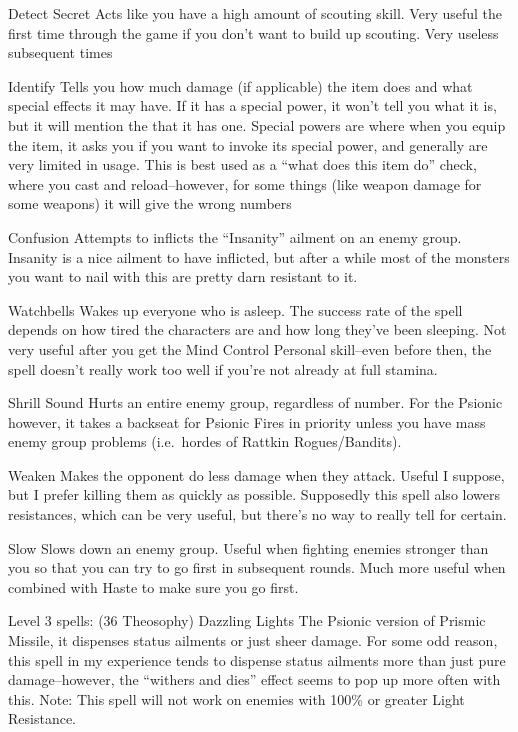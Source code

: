\documentclass[12pt]{article}
\begin{document}
Detect Secret Acts like you have a high amount of scouting skill. Very
useful the first time through the game if you don't want to build up
scouting. Very useless subsequent times

Identify Tells you how much damage (if applicable) the item does and
what special effects it may have. If it has a special power, it won't
tell you what it is, but it will mention the that it has one. Special
powers are where when you equip the item, it asks you if you want to
invoke its special power, and generally are very limited in usage. This
is best used as a ``what does this item do'' check, where you cast and
reload--however, for some things (like weapon damage for some weapons)
it will give the wrong numbers

Confusion Attempts to inflicts the ``Insanity'' ailment on an enemy
group. Insanity is a nice ailment to have inflicted, but after a while
most of the monsters you want to nail with this are pretty darn
resistant to it.

Watchbells Wakes up everyone who is asleep. The success rate of the
spell depends on how tired the characters are and how long they've been
sleeping. Not very useful after you get the Mind Control Personal
skill--even before then, the spell doesn't really work too well if
you're not already at full stamina.

Shrill Sound Hurts an entire enemy group, regardless of number. For the
Psionic however, it takes a backseat for Psionic Fires in priority
unless you have mass enemy group problems (i.e.~hordes of Rattkin
Rogues/Bandits).

Weaken Makes the opponent do less damage when they attack. Useful I
suppose, but I prefer killing them as quickly as possible. Supposedly
this spell also lowers resistances, which can be very useful, but
there's no way to really tell for certain.

Slow Slows down an enemy group. Useful when fighting enemies stronger
than you so that you can try to go first in subsequent rounds. Much more
useful when combined with Haste to make sure you go first.

Level 3 spells: (36 Theosophy) Dazzling Lights The Psionic version of
Prismic Missile, it dispenses status ailments or just sheer damage. For
some odd reason, this spell in my experience tends to dispense status
ailments more than just pure damage--however, the ``withers and dies''
effect seems to pop up more often with this. Note: This spell will not
work on enemies with 100\% or greater Light Resistance.
\end{document}
